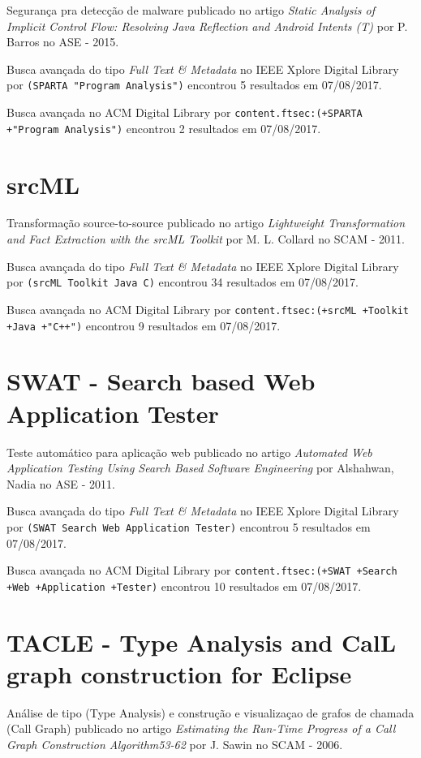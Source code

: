 Segurança pra detecção de malware
publicado no artigo
{\it Static Analysis of Implicit Control Flow: Resolving Java Reflection and Android Intents (T)}
por
P. Barros
no
ASE
-
2015.

Busca avançada do tipo {\it Full Text \& Metadata} no IEEE Xplore Digital Library por
\texttt{(SPARTA "Program Analysis")}
encontrou
5 resultados em
07/08/2017.

Busca avançada no ACM Digital Library por
\texttt{content.ftsec:(+SPARTA +"Program Analysis")}
encontrou
2 resultados em
07/08/2017.

\section{srcML}

Transformação source-to-source
publicado no artigo
{\it Lightweight Transformation and Fact Extraction with the srcML Toolkit}
por
M. L. Collard
no
SCAM
-
2011.

Busca avançada do tipo {\it Full Text \& Metadata} no IEEE Xplore Digital Library por
\texttt{(srcML Toolkit Java C)}
encontrou
34 resultados em
07/08/2017.

Busca avançada no ACM Digital Library por
\texttt{content.ftsec:(+srcML +Toolkit +Java +"C++")}
encontrou
9 resultados em
07/08/2017.

\section{SWAT - Search based Web Application Tester}

Teste automático para aplicação web
publicado no artigo
{\it Automated Web Application Testing Using Search Based Software Engineering}
por
Alshahwan, Nadia
no
ASE
-
2011.

Busca avançada do tipo {\it Full Text \& Metadata} no IEEE Xplore Digital Library por
\texttt{(SWAT Search Web Application Tester)}
encontrou
5 resultados em
07/08/2017.

Busca avançada no ACM Digital Library por
\texttt{content.ftsec:(+SWAT +Search +Web +Application +Tester)}
encontrou
10 resultados em
07/08/2017.

\section{TACLE - Type Analysis and CalL graph construction for Eclipse}

Análise de tipo (Type Analysis) e construção e visualizaçao de grafos de chamada (Call Graph)
publicado no artigo
{\it Estimating the Run-Time Progress of a Call Graph Construction Algorithm53-62}
por
J. Sawin
no
SCAM
-
2006.

